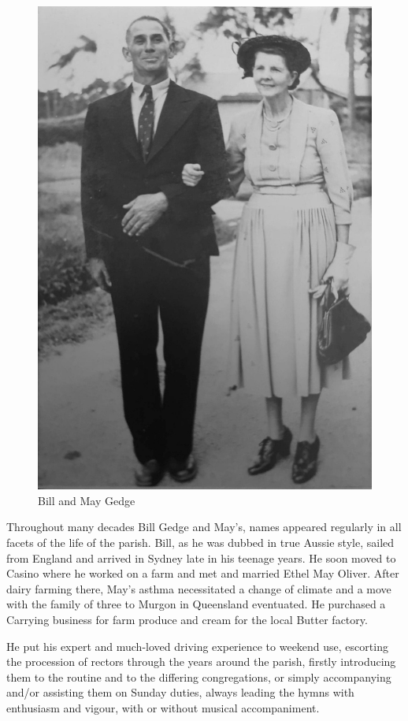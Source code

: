 \begin{figure}
\begin{center}
\includegraphics[width=.7\linewidth,center]{../images/BillAndMayGedge.jpg}
\caption{Bill and May Gedge}
\end{center}
\end{figure}




Throughout many decades Bill Gedge and May's, names appeared regularly in all facets of the life of the parish. Bill, as he was dubbed in true Aussie style, sailed from England and arrived in Sydney late in his teenage years. He soon moved to Casino where he worked on a farm and met and married Ethel May Oliver. After dairy farming there, May's asthma necessitated a change of climate and a move with the family of three to Murgon in Queensland eventuated. He purchased a Carrying business for farm produce and cream for the local Butter factory.



He put his expert and much-loved driving experience to weekend use, escorting the procession of rectors through the years around the parish, firstly introducing them to the routine and to the differing congregations, or simply accompanying and/or assisting them on Sunday duties, always leading the hymns with enthusiasm and vigour, with or without musical accompaniment.



